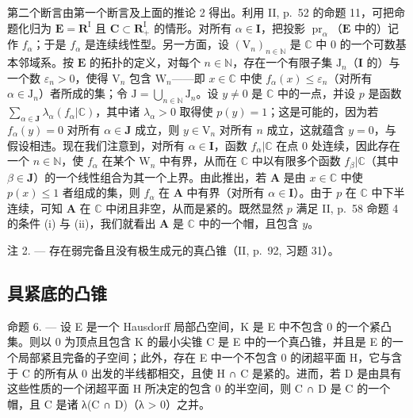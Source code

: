 第二个断言由第一个断言及上面的推论 2 得出。利用 II, p.~52 的命题 11，可把命题化归为 \(\mathbf{E} = \mathbf{R}^{\mathrm{I}}\) 且 \(\mathbf{C} \subset \mathbf{R}_{+}^{\mathrm{I}}\) 的情形。对所有 \(\alpha \in \mathbf{I}\)，把投影 \(\operatorname{pr}_{\alpha}\)（\(\mathbf{E}\) 中的）记作 \(f_{\alpha}\)；于是 \(f_{\alpha}\) 是连续线性型。另一方面，设 \((\mathrm{V}_n)_{n \in \mathbb{N}}\) 是 \(\mathbb{C}\) 中 0 的一个可数基本邻域系。按 \(\mathbf{E}\) 的拓扑的定义，对每个 \(n \in \mathbb{N}\)，存在一个有限子集 \(\mathrm{J}_n\)（\(\mathbf{I}\) 的）与一个数 \(\varepsilon_n > 0\)，使得 \(\mathrm{V}_n\) 包含 \(\mathrm{W}_n\)——即 \(x \in \mathbb{C}\) 中使 \(f_{\alpha}(x) \leqslant \varepsilon_n\)（对所有 \(\alpha \in \mathrm{J}_n\)）者所成的集；令 \(\mathrm{J} = \bigcup_{n \in \mathbb{N}} \mathrm{J}_n\)。设 \(y \neq 0\) 是 \(\mathbb{C}\) 中的一点，并设 \(p\) 是函数 \(\sum_{\alpha \in \mathbf{J}} \lambda_{\alpha}(f_{\alpha}|\mathbb{C})\)，其中诸 \(\lambda_{\alpha} > 0\) 取得使 \(p(y) = 1\)；这是可能的，因为若 \(f_{\alpha}(y) = 0\) 对所有 \(\alpha \in \mathbf{J}\) 成立，则 \(y \in \mathrm{V}_n\) 对所有 \(n\) 成立，这就蕴含 \(y = 0\)，与假设相违。现在我们注意到，对所有 \(\alpha \in \mathbf{I}\)，函数 \(f_{\alpha}|\mathbb{C}\) 在点 0 处连续，因此存在一个 \(n \in \mathbb{N}\)，使 \(f_{\alpha}\) 在某个 \(\mathrm{W}_n\) 中有界，从而在 \(\mathbb{C}\) 中以有限多个函数 \(f_{\beta}|\mathbb{C}\)（其中 \(\beta \in \mathbf{J}\)）的一个线性组合为其一个上界。由此推出，若 \(\mathbf{A}\) 是由 \(x \in \mathbb{C}\) 中使 \(p(x) \leqslant 1\) 者组成的集，则 \(f_{\alpha}\) 在 \(\mathbf{A}\) 中有界（对所有 \(\alpha \in \mathbf{I}\)）。由于 \(p\) 在 \(\mathbb{C}\) 中下半连续，可知 \(\mathbf{A}\) 在 \(\mathbb{C}\) 中闭且非空，从而是紧的。既然显然 \(p\) 满足 II, p.~58 命题 4 的条件 (i) 与 (ii)，我们就看出 \(\mathbf{A}\) 是 \(\mathbb{C}\) 中的一个帽，且包含 \(y\)。

注 2. --- 存在弱完备且没有极生成元的真凸锥（II, p.~92, 习题 31）。

\subsection{具紧底的凸锥}

命题 6. --- 设 E 是一个 Hausdorff 局部凸空间，K 是 E 中不包含 0 的一个紧凸集。则以 0 为顶点且包含 K 的最小尖锥 C 是 E 中的一个真凸锥，并且是 E 的一个局部紧且完备的子空间；此外，存在 E 中一个不包含 0 的闭超平面 H，它与含于 C 的所有从 0 出发的半线都相交，且使 H ∩ C 是紧的。进而，若 D 是由具有这些性质的一个闭超平面 H 所决定的包含 0 的半空间，则 C ∩ D 是 C 的一个帽，且 C 是诸 λ(C ∩ D)（λ \textgreater{} 0）之并。

